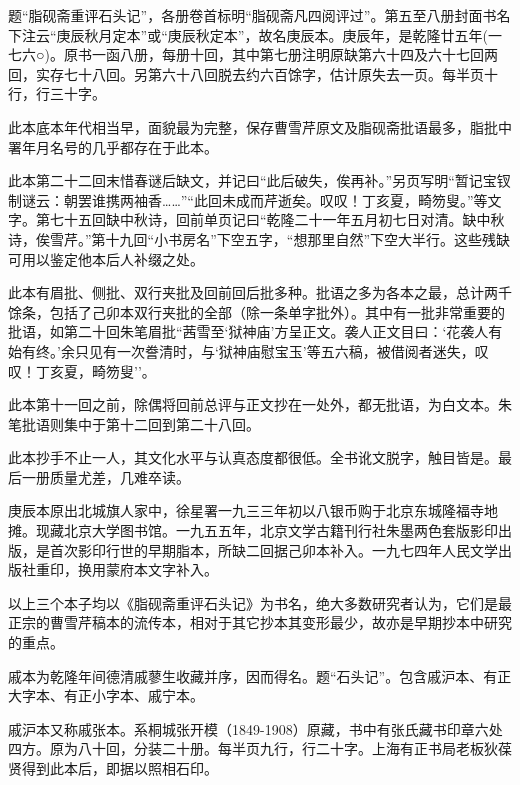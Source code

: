 {}

题``脂砚斋重评石头记''，各册卷首标明``脂砚斋凡四阅评过''。第五至八册封面书名下注云``庚辰秋月定本''或``庚辰秋定本''，故名庚辰本。庚辰年，是乾隆廿五年(一七六○)。原书一函八册，每册十回，其中第七册注明原缺第六十四及六十七回两回，实存七十八回。另第六十八回脱去约六百馀字，估计原失去一页。每半页十行，行三十字。

此本底本年代相当早，面貌最为完整，保存曹雪芹原文及脂砚斋批语最多，脂批中署年月名号的几乎都存在于此本。

此本第二十二回末惜春谜后缺文，并记曰``此后破失，俟再补。''另页写明``暂记宝钗制谜云：朝罢谁携两袖香\ldots{}\ldots{}''``此回未成而芹逝矣。叹叹！丁亥夏，畸笏叟。''等文字。第七十五回缺中秋诗，回前单页记曰``乾隆二十一年五月初七日对清。缺中秋诗，俟雪芹。''第十九回``小书房名''下空五字，``想那里自然''下空大半行。这些残缺可用以鉴定他本后人补缀之处。

此本有眉批、侧批、双行夹批及回前回后批多种。批语之多为各本之最，总计两千馀条，包括了己卯本双行夹批的全部（除一条单字批外）。其中有一批非常重要的批语，如第二十回朱笔眉批``茜雪至`狱神庙'方呈正文。袭人正文目曰：`花袭人有始有终。'余只见有一次誊清时，与`狱神庙慰宝玉'等五六稿，被借阅者迷失，叹叹！丁亥夏，畸笏叟''。

此本第十一回之前，除偶将回前总评与正文抄在一处外，都无批语，为白文本。朱笔批语则集中于第十二回到第二十八回。

此本抄手不止一人，其文化水平与认真态度都很低。全书讹文脱字，触目皆是。最后一册质量尤差，几难卒读。

庚辰本原出北城旗人家中，徐星署一九三三年初以八银币购于北京东城隆福寺地摊。现藏北京大学图书馆。一九五五年，北京文学古籍刊行社朱墨两色套版影印出版，是首次影印行世的早期脂本，所缺二回据己卯本补入。一九七四年人民文学出版社重印，换用蒙府本文字补入。

以上三个本子均以《脂砚斋重评石头记》为书名，绝大多数研究者认为，它们是最正宗的曹雪芹稿本的流传本，相对于其它抄本其变形最少，故亦是早期抄本中研究的重点。

{}

戚本为乾隆年间德清戚蓼生收藏并序，因而得名。题``石头记''。包含戚沪本、有正大字本、有正小字本、戚宁本。

戚沪本又称戚张本。系桐城张开模（1849-1908）原藏，书中有张氏藏书印章六处四方。原为八十回，分装二十册。每半页九行，行二十字。上海有正书局老板狄葆贤得到此本后，即据以照相石印。

